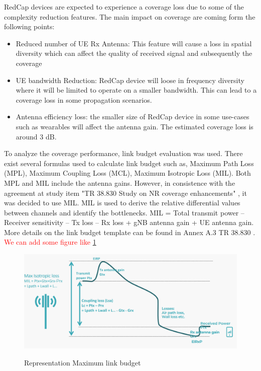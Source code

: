 \documentclass[conference]{IEEEtran}
\begin{document}
RedCap devices are expected to experience a coverage loss due to some of the complexity reduction features. The main impact on coverage are coming form the following points:
\begin{itemize}
    \item Reduced number of UE Rx Antenna: This feature will cause a loss in spatial diversity which can affect the quality of received signal and subsequently the coverage 
    \item UE bandwidth Reduction: RedCap device will loose in frequency diversity where it will be limited to operate on a smaller bandwidth. This can lead to a coverage loss in some propagation scenarios.
    \item Antenna efficiency loss: the smaller size of RedCap device in some use-cases such as wearables will affect the antenna gain. The estimated coverage loss is around 3 dB.
\end{itemize}

To analyze the coverage performance, link budget evaluation was used. There exist several formulas used to calculate link budget such as, Maximum Path Loss (MPL), Maximum Coupling Loss (MCL), Maximum Isotropic Loss (MIL). Both MPL and MIL include the antenna gains. However, in consistence with the agreement at study item "TR 38.830 Study on NR coverage enhancements" \cite{3gpp_study_nodate-3_38.830}, it was decided to use MIL. MIL is used to derive the relative differential values between channels and identify the bottlenecks. MIL = Total transmit power – Receiver sensitivity – Tx loss – Rx loss + gNB antenna gain + UE antenna gain. More details on the link budget template can be found in Annex A.3 TR 38.830 \cite{3gpp_study_nodate-3_38.830}. \textcolor{red}{We can add some figure like \ref{fig:MIL-diagram}}

\begin{figure}
    \centering
    \includegraphics[width=\linewidth]{Pictures/Link budget representation.png}
    \label{fig:MIL-diagram}
    \caption{Representation Maximum link budget}
\end{figure}
\end{document}
